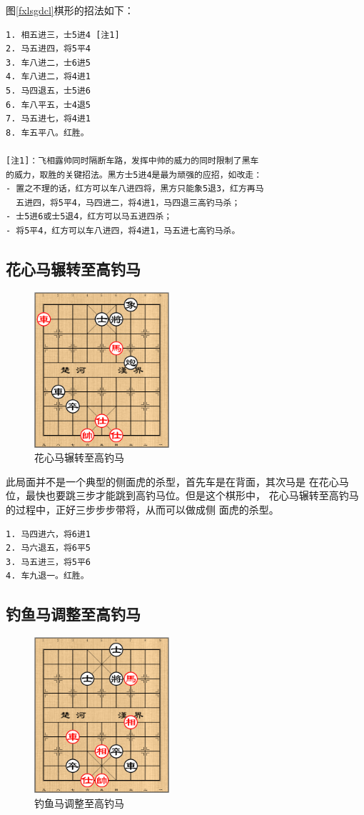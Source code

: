 \documentclass[a5paper,twoside]{book}
\begin{document}
图\ref{fxlsgdcl}棋形的招法如下：

\begin{verbatim}
1. 相五进三，士5进4 [注1]
2. 马五进四，将5平4
3. 车八进二，士6进5
4. 车八进二，将4进1
5. 马四退五，士5进6
6. 车八平五，士4退5
7. 马五进七，将4进1
8. 车五平八。红胜。   
   
[注1]：飞相露帅同时隔断车路，发挥中帅的威力的同时限制了黑车
的威力，取胜的关键招法。黑方士5进4是最为顽强的应招，如改走：
- 置之不理的话，红方可以车八进四将，黑方只能象5退3，红方再马
  五进四，将5平4，马四进二，将4进1，马四退三高钓马杀；
- 士5进6或士5退4，红方可以马五进四杀；
- 将5平4，红方可以车八进四，将4进1，马五进七高钓马杀。
\end{verbatim}

\subsection{花心马辗转至高钓马}
\label{sec-4-5-3}
\begin{figure}[H]
\centering
\includegraphics[width=5cm]{pic/花心马辗转至高钓马.png}
\caption{花心马辗转至高钓马}
\end{figure}

此局面并不是一个典型的侧面虎的杀型，首先车是在背面，其次马是
在花心马位，最快也要跳三步才能跳到高钓马位。但是这个棋形中，
花心马辗转至高钓马的过程中，正好三步步步带将，从而可以做成侧
面虎的杀型。

\begin{verbatim}
1. 马四进六，将6进1
2. 马六退五，将6平5
3. 马五进三，将5平6
4. 车九退一。红胜。
\end{verbatim}

\subsection{钓鱼马调整至高钓马}
\label{sec-4-5-4}
\begin{figure}[H]
\centering
\includegraphics[width=5cm]{pic/钓鱼马调整至高钓马.png}
\caption{钓鱼马调整至高钓马}
\end{figure}
\end{document}
